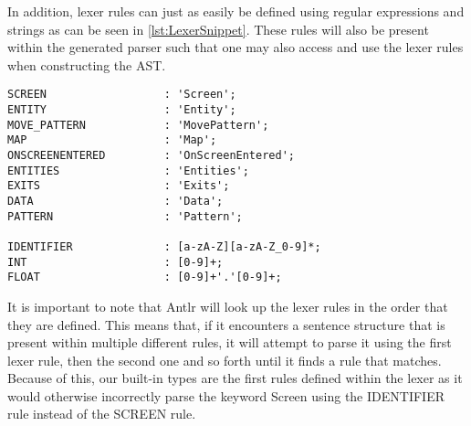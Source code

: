 In addition, lexer rules can just as easily be defined using regular expressions and strings as can be seen in \ref{lst:LexerSnippet}.
These rules will also be present within the generated parser such that one may also access and use the lexer rules when constructing the AST. 

\begin{lstlisting}[caption={A snippet of few lexer rules for \dazel{}.}, label={lst:LexerSnippet},escapechar=|]
SCREEN                  : 'Screen';
ENTITY                  : 'Entity';
MOVE_PATTERN            : 'MovePattern';
MAP                     : 'Map';
ONSCREENENTERED         : 'OnScreenEntered';
ENTITIES                : 'Entities';
EXITS                   : 'Exits';
DATA                    : 'Data';
PATTERN                 : 'Pattern';

IDENTIFIER              : [a-zA-Z][a-zA-Z_0-9]*;
INT                     : [0-9]+;
FLOAT                   : [0-9]+'.'[0-9]+;	
\end{lstlisting}

It is important to note that Antlr will look up the lexer rules in the order that they are defined. 
This means that, if it encounters a sentence structure that is present within multiple different rules, it will attempt to parse it using the first lexer rule, then the second one and so forth until it finds a rule that matches. 
Because of this, our built-in types are the first rules defined within the lexer as it would otherwise incorrectly parse the keyword Screen using the IDENTIFIER rule instead of the SCREEN rule.
